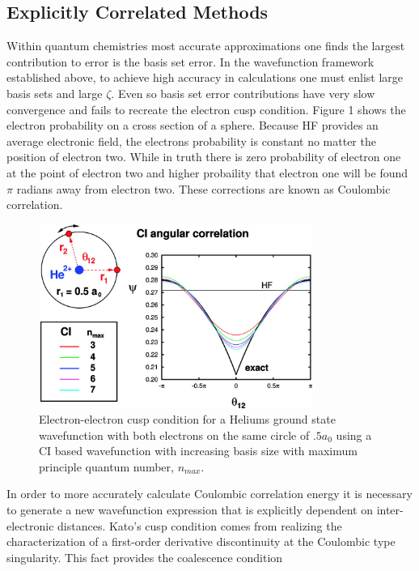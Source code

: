   \subsection{Explicitly Correlated Methods}
    Within quantum chemistries most accurate approximations one finds the largest contribution to error is the basis set error.  %
    In the wavefunction framework established above, to achieve high accuracy in calculations one must enlist large basis sets and large $\zeta$.  Even so basis set error contributions have very slow convergence and fails to recreate the electron cusp condition.  Figure 1 shows the electron probability on a cross section of a sphere.  Because HF provides an average electronic field, the electrons probability is constant no matter the position of electron two.  While in truth there is zero probability of electron one at the point of electron two and higher probaility that electron one will be found $\pi$ radians away from electron two.  These corrections are known as Coulombic correlation. 
    \begin{figure}[H]
      \centering
        \includegraphics[width = 9cm, height = 6cm]{./pics/ang.jpeg}
        \caption{Electron-electron cusp condition for a Heliums ground state wavefunction with both electrons on the same circle of $.5 a_0$ using a CI based wavefunction with increasing basis size with maximum principle quantum number, $n_{max}$\cite{Hatting 2012}.}
    \end{figure}
    In order to more accurately calculate Coulombic correlation energy it is necessary to generate a new wavefunction expression that is explicitly dependent on inter-electronic distances. Kato's cusp condition\cite{kato 1957} comes from realizing the characterization of a first-order derivative discontinuity at the Coulombic type singularity\cite{Hatting 2012}. This fact provides the coalescence condition 
